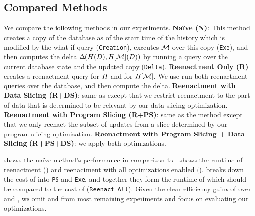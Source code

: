 \subsection{Compared Methods}
We compare the following methods in our experiments.
\textbf{Naïve (N)}: This method creates a copy of the database as of the start time of the history which is modified by the what-if query (\texttt{Creation}), executes $\mathcal{M}$ over this copy (\texttt{Exe}), and then computes the delta $\Delta(H(D),H[\mathcal{M}](D))$ by running a query over the current database state and the updated copy (\texttt{Delta}).
\textbf{Reenactment Only (R)} creates a reenactment query for $H$ and for $H[\mathcal{M}]$.
We use run both reenactment queries over the database, and then compute the delta. \textbf{Reenactment with Data Slicing (R+DS)}: same as \mr except that we restrict reenactment to the part of data that is determined to be relevant  by our data slicing optimization. \textbf{Reenactment with Program Slicing (R+PS)}: same as the \mr method except that we only reenact the subset of updates from a slice determined by our program slicing optimization. \textbf{Reenactment with Program Slicing + Data Slicing (R+PS+DS)}:  we apply both optimizations.

 shows the naïve method's performance in comparison to \mrdp.  shows the runtime of reenactment (\mr) and reenactment with all optimizations enabled (\mrdp).   breaks down the cost of \mrdp into \texttt{PS} and \texttt{Exe}, and together they form the runtime of \mrdp which should be compared to the cost of \mr (\texttt{Reenact All}). Given the clear efficiency gains of \mrdp over \mn and \mr, we omit \mn and \mr from most remaining experiments and focus on evaluating our optimizations.


